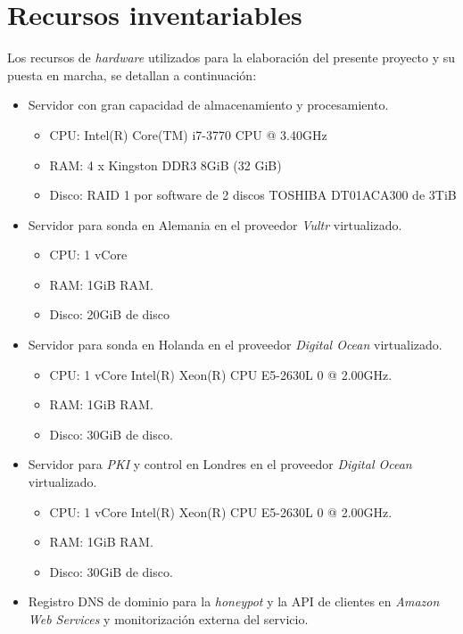 \section{Recursos inventariables}

Los recursos de \emph{hardware} utilizados para la elaboración del presente proyecto y su puesta en marcha, se detallan a continuación:

\begin{itemize}
    \item Servidor con gran capacidad de almacenamiento y procesamiento.
    \begin{itemize}
        \item CPU: Intel(R) Core(TM) i7-3770 CPU @ 3.40GHz
        \item RAM: 4 x Kingston DDR3 8GiB (32 GiB)
        \item Disco: RAID 1 por software de 2 discos TOSHIBA DT01ACA300 de 3TiB
    \end{itemize}

    \item Servidor para sonda en Alemania en el proveedor \emph{Vultr} virtualizado.
    \begin{itemize}
        \item CPU: 1 vCore
        \item RAM: 1GiB RAM.
        \item Disco: 20GiB de disco
    \end{itemize}

    \item Servidor para sonda en Holanda en el proveedor \emph{Digital Ocean} virtualizado.
    \begin{itemize}
        \item CPU: 1 vCore Intel(R) Xeon(R) CPU E5-2630L 0 @ 2.00GHz.
        \item RAM: 1GiB RAM.
        \item Disco: 30GiB de disco.
    \end{itemize}

    \item Servidor para \emph{PKI} y control en Londres en el proveedor \emph{Digital Ocean} virtualizado.
    \begin{itemize}
        \item CPU: 1 vCore Intel(R) Xeon(R) CPU E5-2630L 0 @ 2.00GHz.
        \item RAM: 1GiB RAM.
        \item Disco: 30GiB de disco.
    \end{itemize}

    \item Registro DNS de dominio para la \emph{honeypot} y la API de clientes en \emph{Amazon Web Services} y monitorización
    externa del servicio.

\end{itemize}


